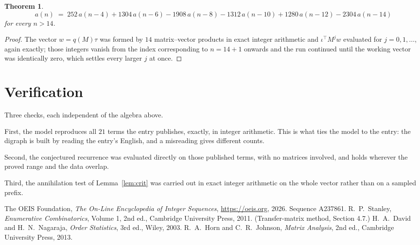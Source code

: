 \documentclass[11pt,a4paper]{article}
\theoremstyle{plain}
\newtheorem{theorem}{Theorem}
\theoremstyle{definition}
\begin{document}
\begin{theorem}
\[
a(n)\;=\;252\,a(n-4) + 1304\,a(n-6) - 1908\,a(n-8) - 1312\,a(n-10) + 1280\,a(n-12) - 2304\,a(n-14)
\]
for every $n>14$.
\end{theorem}

\begin{proof}
The vector $w=q(M)\tau$ was formed by $14$ matrix--vector products in exact integer
arithmetic and $\iota^{\!\top}M^{j}w$ evaluated for $j=0,1,\dots$, again exactly; those
integers vanish from the index corresponding to $n=14+1$ onwards and the run continued
until the working vector was identically zero, which settles every larger $j$ at once.
\end{proof}

\section{Verification}

Three checks, each independent of the algebra above.

First, the model reproduces all $21$ terms the entry publishes, exactly, in integer
arithmetic. This is what ties the model to the entry: the digraph is built by reading the
entry's English, and a misreading gives different counts.

Second, the conjectured recurrence was evaluated directly on those published terms, with no
matrices involved, and holds wherever the proved range and the data overlap.

Third, the annihilation test of Lemma~\ref{lem:crit} was carried out in exact integer
arithmetic on the whole vector rather than on a sampled prefix.

\begin{thebibliography}{9}
 The OEIS Foundation, \emph{The On-Line Encyclopedia of Integer
Sequences}, \url{https://oeis.org}, 2026. Sequence A237861.
 R.~P.~Stanley, \emph{Enumerative Combinatorics}, Volume 1, 2nd ed.,
Cambridge University Press, 2011. (Transfer-matrix method, Section 4.7.)
 H.~A.~David and H.~N.~Nagaraja, \emph{Order Statistics}, 3rd ed., Wiley,
2003.
 R.~A.~Horn and C.~R.~Johnson, \emph{Matrix Analysis}, 2nd ed., Cambridge
University Press, 2013.
\end{thebibliography}
\end{document}
